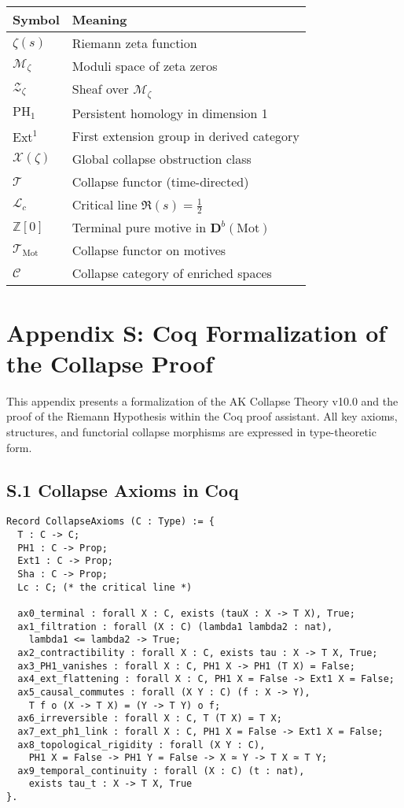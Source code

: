 \documentclass[11pt]{article}
\newcommand{\Sha}{\mathcal{X}}
\begin{document}
\begin{tabular}{ll}
\textbf{Symbol} & \textbf{Meaning} \\
\hline
$\zeta(s)$ & Riemann zeta function \\
$\mathcal{M}_\zeta$ & Moduli space of zeta zeros \\
$\mathcal{Z}_\zeta$ & Sheaf over $\mathcal{M}_\zeta$ \\
$\mathrm{PH}_1$ & Persistent homology in dimension 1 \\
$\mathrm{Ext}^1$ & First extension group in derived category \\
$\Sha(\zeta)$ & Global collapse obstruction class \\
$\mathcal{T}$ & Collapse functor (time-directed) \\
$\mathcal{L}_c$ & Critical line $\Re(s) = \tfrac{1}{2}$ \\
$\mathbb{Z}[0]$ & Terminal pure motive in $\mathbf{D}^b(\text{Mot})$ \\
$\mathcal{T}_{\mathrm{Mot}}$ & Collapse functor on motives \\
$\mathcal{C}$ & Collapse category of enriched spaces \\
\end{tabular}



\section*{Appendix S: Coq Formalization of the Collapse Proof}

This appendix presents a formalization of the AK Collapse Theory v10.0 and the proof of the Riemann Hypothesis  
within the Coq proof assistant. All key axioms, structures, and functorial collapse morphisms are expressed in type-theoretic form.

\subsection*{S.1 Collapse Axioms in Coq}

\begin{lstlisting}[caption={Collapse Axioms A0–A9}]
Record CollapseAxioms (C : Type) := {
  T : C -> C;
  PH1 : C -> Prop;
  Ext1 : C -> Prop;
  Sha : C -> Prop;
  Lc : C; (* the critical line *)

  ax0_terminal : forall X : C, exists (tauX : X -> T X), True;
  ax1_filtration : forall (X : C) (lambda1 lambda2 : nat),
    lambda1 <= lambda2 -> True;
  ax2_contractibility : forall X : C, exists tau : X -> T X, True;
  ax3_PH1_vanishes : forall X : C, PH1 X -> PH1 (T X) = False;
  ax4_ext_flattening : forall X : C, PH1 X = False -> Ext1 X = False;
  ax5_causal_commutes : forall (X Y : C) (f : X -> Y),
    T f o (X -> T X) = (Y -> T Y) o f;
  ax6_irreversible : forall X : C, T (T X) = T X;
  ax7_ext_ph1_link : forall X : C, PH1 X = False -> Ext1 X = False;
  ax8_topological_rigidity : forall (X Y : C),
    PH1 X = False -> PH1 Y = False -> X ≃ Y -> T X ≃ T Y;
  ax9_temporal_continuity : forall (X : C) (t : nat),
    exists tau_t : X -> T X, True
}.
\end{lstlisting}
\end{document}
